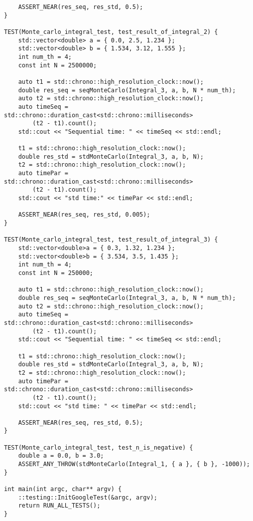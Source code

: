 \documentclass{report}
\begin{document}
\begin{lstlisting}
    ASSERT_NEAR(res_seq, res_std, 0.5);
}

TEST(Monte_carlo_integral_test, test_result_of_integral_2) {
    std::vector<double> a = { 0.0, 2.5, 1.234 };
    std::vector<double> b = { 1.534, 3.12, 1.555 };
    int num_th = 4;
    const int N = 2500000;

    auto t1 = std::chrono::high_resolution_clock::now();
    double res_seq = seqMonteCarlo(Integral_3, a, b, N * num_th);
    auto t2 = std::chrono::high_resolution_clock::now();
    auto timeSeq = std::chrono::duration_cast<std::chrono::milliseconds>
        (t2 - t1).count();
    std::cout << "Sequential time: " << timeSeq << std::endl;

    t1 = std::chrono::high_resolution_clock::now();
    double res_std = stdMonteCarlo(Integral_3, a, b, N);
    t2 = std::chrono::high_resolution_clock::now();
    auto timePar = std::chrono::duration_cast<std::chrono::milliseconds>
        (t2 - t1).count();
    std::cout << "std time:" << timePar << std::endl;

    ASSERT_NEAR(res_seq, res_std, 0.005);
}

TEST(Monte_carlo_integral_test, test_result_of_integral_3) {
    std::vector<double>a = { 0.3, 1.32, 1.234 };
    std::vector<double>b = { 3.534, 3.5, 1.435 };
    int num_th = 4;
    const int N = 250000;

    auto t1 = std::chrono::high_resolution_clock::now();
    double res_seq = seqMonteCarlo(Integral_3, a, b, N * num_th);
    auto t2 = std::chrono::high_resolution_clock::now();
    auto timeSeq = std::chrono::duration_cast<std::chrono::milliseconds>
        (t2 - t1).count();
    std::cout << "Sequential time: " << timeSeq << std::endl;

    t1 = std::chrono::high_resolution_clock::now();
    double res_std = stdMonteCarlo(Integral_3, a, b, N);
    t2 = std::chrono::high_resolution_clock::now();
    auto timePar = std::chrono::duration_cast<std::chrono::milliseconds>
        (t2 - t1).count();
    std::cout << "std time: " << timePar << std::endl;

    ASSERT_NEAR(res_seq, res_std, 0.5);
}

TEST(Monte_carlo_integral_test, test_n_is_negative) {
    double a = 0.0, b = 3.0;
    ASSERT_ANY_THROW(stdMonteCarlo(Integral_1, { a }, { b }, -1000));
}

int main(int argc, char** argv) {
    ::testing::InitGoogleTest(&argc, argv);
    return RUN_ALL_TESTS();
}
\end{lstlisting}
\end{document}
